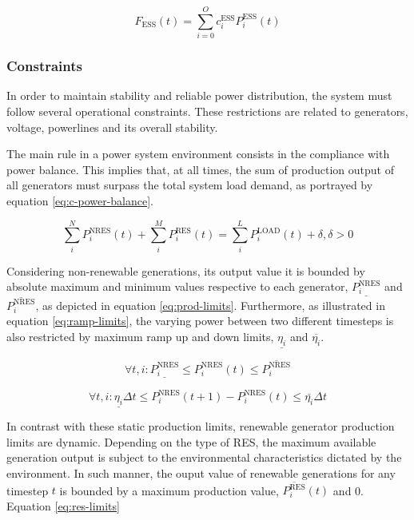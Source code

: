 \begin{equation} \label{eq:ess-cost}
	F_\text{ESS}(t) = \sum^O_{i=0} c^\text{ESS}_i P^\text{ESS}_i(t) 
\end{equation}



\subsubsection{Constraints}

In order to maintain stability and reliable power distribution, the system must follow several operational constraints. These restrictions are related to generators, voltage, powerlines and its overall stability.  \par

The main rule in a power system environment consists in the compliance with power balance. This  implies that, at all times, the sum of production output of all generators must surpass the total system load demand, as portrayed by equation \ref{eq:c-power-balance}. 

\begin{equation} \label{eq:c-power-balance}
	\sum^N_i P^\text{NRES}_i(t) + \sum^M_i P^\text{RES}_i(t) = \sum^L_i P^\text{LOAD}_i(t) + \delta, \delta > 0
\end{equation}

Considering non-renewable generations, its output value it is bounded by absolute maximum and minimum values respective to each generator, $\underline{P^\text{NRES}_i}$ and $\overline{P^\text{NRES}_i}$, as depicted in equation \ref{eq:prod-limits}. Furthermore, as illustrated in equation \ref{eq:ramp-limits}, the varying power between two different timesteps is also restricted by maximum ramp up and down limits, $\underline{\eta_i }$ and $\overline{\eta_i }$. \par

\begin{equation} \label{eq:prod-limits}
	\forall t, i: \underline{P^\text{NRES}_i} \leq P^\text{NRES}_i(t) \leq \overline{P^\text{NRES}_i}
\end{equation}

\begin{equation} \label{eq:ramp-limits}
	\forall t, i: \underline{\eta_i } \Delta t \leq P^\text{NRES}_i (t + 1) - P^\text{NRES}_i (t) \leq \overline{\eta_i} \Delta t
\end{equation}

In contrast with these static production limits, renewable generator production limits are dynamic. Depending on the type of \ac{RES}, the maximum available generation output is subject to the environmental characteristics dictated by the environment. In such manner, the ouput value of renewable generations for any timestep $t$ is bounded by a maximum production value, $\overline{P^\text{RES}_i} (t)$ and 0. Equation \ref{eq:res-limits}

